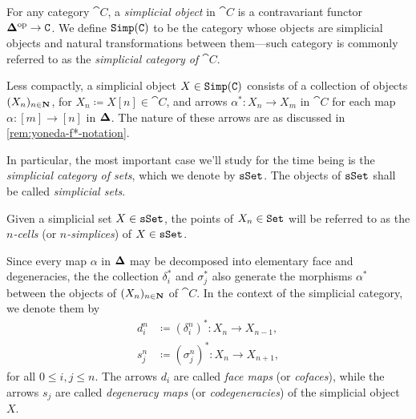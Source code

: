 \begin{definition}
\label{def:simplicial-object}
For any category \(\cat C\), a \emph{simplicial object} in \(\cat C\) is a
contravariant functor \({\mathbf{\Delta}}^{\mathrm{op}} \to \texttt C\). We define \({\texttt{Simp}(\texttt C)}\) to
be the category whose objects are simplicial objects and natural transformations
between them---such category is commonly referred to as the \emph{simplicial
  category of \(\cat C\)}.
\end{definition}

\begin{notation}
\label{not:unwrapping-the-definition}
Less compactly, a simplicial object \(X \in {\texttt{Simp}(\texttt C)}\) consists of a
collection of objects \((X_n)_{n \in \mathbf{N}}\), for
\(X_n \coloneq X [n] \in \cat C\), and arrows \(\alpha^{*}: X_n \to X_m\) in
\(\cat C\) for each map \(\alpha: [m] \to [n]\) in \({\mathbf{\Delta}}\). The nature of
these arrows are as discussed in \cref{rem:yoneda-f*-notation}.
\end{notation}

\begin{notation}
\label{not:simplicial-sets-notation-and-nomenclature}
In particular, the most important case we'll study for the time being is the
\emph{simplicial category of sets}, which we denote by \({\texttt{sSet}}\). The objects of
\({\texttt{sSet}}\) shall be called \emph{simplicial sets}.\

Given a simplicial set \(X \in {\texttt{sSet}}\), the points of \(X_n \in {\texttt{Set}}\) will be
referred to as the \emph{\(n\)-cells} (or \emph{\(n\)-simplices}) of
\(X \in {\texttt{sSet}}\).
\end{notation}

Since every map \(\alpha\) in \({\mathbf{\Delta}}\) may be decomposed into elementary face
and degeneracies, the the collection \(\delta_i^{*}\) and \(\sigma_j^{*}\) also
generate the morphisms \(\alpha^{*}\) between the objects of
\((X_n)_{n \in \mathbf{N}}\) of \(\cat C\). In the context of the simplicial category,
we denote them by
\begin{align*}
  d_i^n &\coloneq (\delta_i^n)^{*}: X_n \longrightarrow X_{n-1}, \\
  s_j^n &\coloneq (\sigma_j^n)^{*}: X_n \longrightarrow X_{n+1},
\end{align*}
for all \(0 \leq i, j \leq n\). The arrows \(d_i\) are called \emph{face maps}
(or \emph{cofaces}), while the arrows \(s_j\) are called \emph{degeneracy maps}
(or \emph{codegeneracies}) of the simplicial object \(X\).

